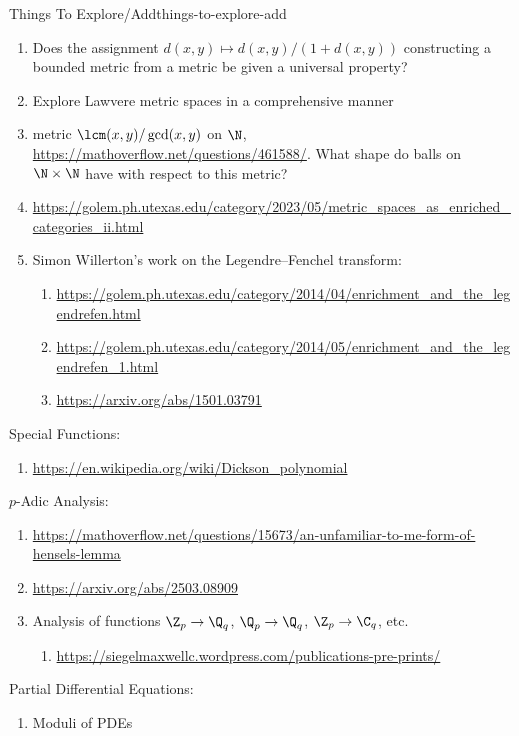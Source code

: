 \begin{remark}{Things To Explore/Add}{things-to-explore-add}
\begin{enumerate}
        \item Does the assignment $d(x,y)\mapsto d(x,y)/(1+d(x,y))$ constructing a bounded metric from a metric be given a universal property?
        \item Explore Lawvere metric spaces in a comprehensive manner
        \item metric $\lcm(x,y)/\gcd(x,y)$ on $\N$, \url{https://mathoverflow.net/questions/461588/}. What shape do balls on $\N\times\N$ have with respect to this metric?
        \item \url{https://golem.ph.utexas.edu/category/2023/05/metric_spaces_as_enriched_categories_ii.html}
        \item Simon Willerton's work on the Legendre--Fenchel transform:
            \begin{enumerate}
                \item \url{https://golem.ph.utexas.edu/category/2014/04/enrichment_and_the_legendrefen.html}
                \item \url{https://golem.ph.utexas.edu/category/2014/05/enrichment_and_the_legendrefen_1.html}
                \item \url{https://arxiv.org/abs/1501.03791}
            \end{enumerate}
    \end{enumerate}
    Special Functions:
    \begin{enumerate}
        \item \url{https://en.wikipedia.org/wiki/Dickson_polynomial}
    \end{enumerate}
    $p$-Adic Analysis:
    \begin{enumerate}
        \item \url{https://mathoverflow.net/questions/15673/an-unfamiliar-to-me-form-of-hensels-lemma}
        \item \url{https://arxiv.org/abs/2503.08909}
        \item Analysis of functions $\Z_{p}\to\Q_{q}$, $\Q_{p}\to\Q_{q}$, $\Z_{p}\to\C_{q}$, etc.
            \begin{enumerate}
                \item \url{https://siegelmaxwellc.wordpress.com/publications-pre-prints/}
            \end{enumerate}
    \end{enumerate}
    Partial Differential Equations:
    \begin{enumerate}
        \item Moduli of PDEs
            \begin{enumerate}

\end{enumerate}
\end{enumerate}
\end{remark}
